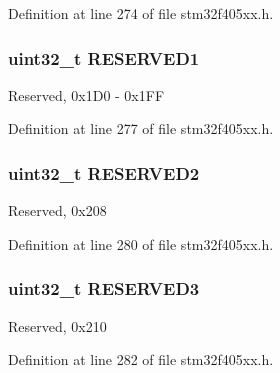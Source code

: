 Definition at line 274 of file stm32f405xx.\+h.

\subsubsection[{\texorpdfstring{R\+E\+S\+E\+R\+V\+E\+D1}{RESERVED1}}]{\setlength{\rightskip}{0pt plus 5cm}uint32\+\_\+t R\+E\+S\+E\+R\+V\+E\+D1}\hypertarget{struct_c_a_n___type_def_a3eee475e36c3753cb1b0e4a09e1e714c}{}\label{struct_c_a_n___type_def_a3eee475e36c3753cb1b0e4a09e1e714c}
Reserved, 0x1\+D0 -\/ 0x1\+FF 

Definition at line 277 of file stm32f405xx.\+h.

\subsubsection[{\texorpdfstring{R\+E\+S\+E\+R\+V\+E\+D2}{RESERVED2}}]{\setlength{\rightskip}{0pt plus 5cm}uint32\+\_\+t R\+E\+S\+E\+R\+V\+E\+D2}\hypertarget{struct_c_a_n___type_def_a4c9b972a304c0e08ca27cbe57627c496}{}\label{struct_c_a_n___type_def_a4c9b972a304c0e08ca27cbe57627c496}
Reserved, 0x208 

Definition at line 280 of file stm32f405xx.\+h.

\subsubsection[{\texorpdfstring{R\+E\+S\+E\+R\+V\+E\+D3}{RESERVED3}}]{\setlength{\rightskip}{0pt plus 5cm}uint32\+\_\+t R\+E\+S\+E\+R\+V\+E\+D3}\hypertarget{struct_c_a_n___type_def_af2b40c5e36a5e861490988275499e158}{}\label{struct_c_a_n___type_def_af2b40c5e36a5e861490988275499e158}
Reserved, 0x210 

Definition at line 282 of file stm32f405xx.\+h.


